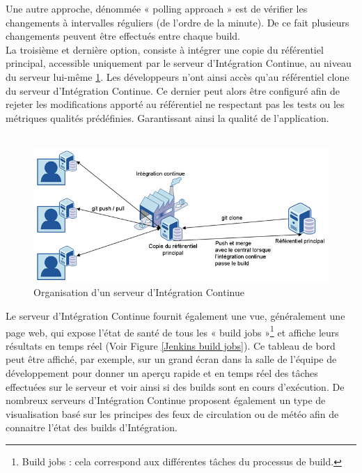     Une autre approche, dénommée « polling approach » \cite{Duv07} est de vérifier les changements à intervalles réguliers (de l’ordre de la minute). De ce fait plusieurs changements peuvent être effectués entre chaque build.\\

    La troisième et dernière option, consiste à intégrer une copie du référentiel principal, accessible uniquement par le serveur d’Intégration Continue, au niveau du serveur lui-même \ref{IC server}. Les développeurs n’ont ainsi accès qu’au référentiel clone du serveur d’Intégration Continue. Ce dernier peut alors être configuré afin de rejeter les modifications apporté au référentiel ne respectant pas les tests ou les métriques qualités prédéfinies. Garantissant ainsi la qualité de l’application.\\\\

    \begin{figure}
      \begin{center}
        \includegraphics[scale=0.5]{images/ICServer.png}
      \end{center}
      \caption{Organisation d'un serveur d'Intégration Continue}
      \label{IC server}
    \end{figure}

    Le serveur d’Intégration Continue fournit également une vue, généralement une page web, qui expose l'état de santé de tous les « build jobs »\footnote{Build jobs : cela correspond aux différentes tâches du processus de build.} et affiche leurs résultats en temps réel (Voir Figure \ref{Jenkins build jobs}). Ce tableau de bord peut être affiché, par exemple, sur un grand écran dans la salle de l'équipe de développement pour donner un aperçu rapide et en temps réel des tâches effectuées sur le serveur et voir ainsi si des builds sont en cours d'exécution. De nombreux serveurs d’Intégration Continue proposent également un type de visualisation basé sur les principes des feux de circulation ou de météo afin de connaitre l’état des builds d’Intégration.\\

